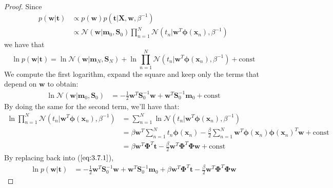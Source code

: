 \vspace{1em}

\begin{proof}
    Since 
    \begin{align*}
        p(\mathbf{w} | \mathbf{t})
        &\propto p(\mathbf{w}) p(\mathbf{t} | \mathbf{X}, \mathbf{w}, \beta^{-1}) \\
        &\propto \mathcal{N}(\mathbf{w} | \mathbf{m}_0, \mathbf{S}_0) 
            \prod_{n=1}^N \mathcal{N}(t_n | \mathbf{w}^T\bm{\phi}(\mathbf{x}_n), \beta^{-1})
    \end{align*}
    we have that
    \begin{equation}\label{eq:3.7.1}\tag{3.7.1}
        \ln p(\mathbf{w} | \mathbf{t})
        = \ln \mathcal{N}(\mathbf{w} | \mathbf{m}_N, \mathbf{S}_N) 
            + \ln \prod_{n=1}^N \mathcal{N}(t_n | \mathbf{w}^T\bm{\phi}(\mathbf{x}_n), \beta^{-1}) 
            + \text{const}
    \end{equation}
    We compute the first logarithm, expand the square and keep only the terms that depend
    on $\mathbf{w}$ to obtain:
    \begin{align*}
        \ln \mathcal{N}(\mathbf{w} | \mathbf{m}_0, \mathbf{S}_0)
        &= -\frac{1}{2} \mathbf{w}^T \mathbf{S}_0^{-1} \mathbf{w} 
            + \mathbf{w}^T\mathbf{S}_0^{-1}\mathbf{m}_0
            + \text{const}
    \end{align*}
    By doing the same for the second term, we'll have that:
    \begin{align*}
        \ln \prod_{n = 1}^N \mathcal{N}(t_n | \mathbf{w}^T \bm{\phi}(\mathbf{x}_n), \beta^{-1})   
        &= \sum_{n=1}^N \ln \mathcal{N}(t_n | \mathbf{w}^T \bm{\phi}(\mathbf{x}_n), \beta^{-1}) \\
        &= \beta \mathbf{w}^T \sum_{n=1}^N t_n \bm{\phi}(\mathbf{x}_n) 
            - \frac{\beta}{2} \sum_{n=1}^N \mathbf{w}^T \bm{\phi}(\mathbf{x}_n)\bm{\phi}(\mathbf{x}_n)^T \mathbf{w} 
            + \text{const} \\
        &= \beta \mathbf{w}^T \mathbf{\Phi}^T \mathbf{t} 
            - \frac{\beta}{2} \mathbf{w}^T\mathbf{\Phi}^T\mathbf{\Phi}\mathbf{w} + \text{const}
    \end{align*}
    By replacing back into ($\ref{eq:3.7.1}$),
    \begin{align*}
        \ln p(\mathbf{w} | \mathbf{t}) 
        &= -\frac{1}{2} \mathbf{w}^T\mathbf{S}_0^{-1}\mathbf{w} 
            + \mathbf{w}^T\mathbf{S}_0^{-1}\mathbf{m}_0
            +\beta\mathbf{w}^T\mathbf{\Phi}^T\mathbf{t}
            - \frac{\beta}{2} \mathbf{w}^T\mathbf{\Phi}^T\mathbf{\Phi}\mathbf{w} 

\end{align*}
\end{proof}
